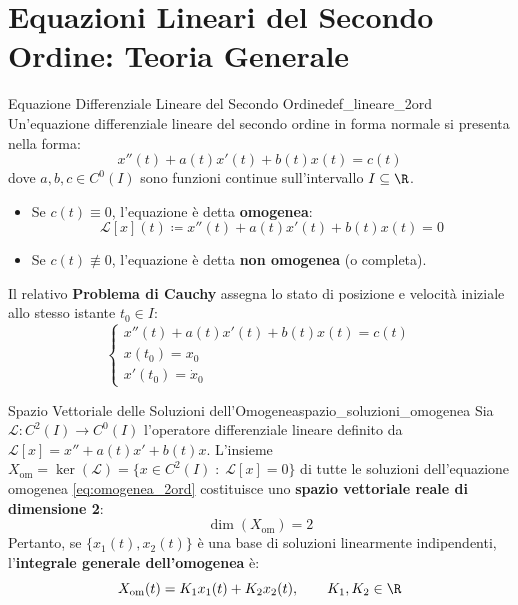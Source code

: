 \section{Equazioni Lineari del Secondo Ordine: Teoria Generale}
\label{sec:lineari_secondo_ordine}

\begin{definizione}{Equazione Differenziale Lineare del Secondo Ordine}{def_lineare_2ord}
Un'equazione differenziale lineare del secondo ordine in forma normale si presenta nella forma:
\begin{equation}
    \label{eq:lineare_2ord}
    x''(t) + a(t) x'(t) + b(t) x(t) = c(t)
\end{equation}
dove $a, b, c \in C^0(I)$ sono funzioni continue sull'intervallo $I \subseteq \R$.
\begin{itemize}
    \item Se $c(t) \equiv 0$, l'equazione è detta \textbf{omogenea}:
    \begin{equation}
        \label{eq:omogenea_2ord}
        \mathcal{L}[x](t) \coloneqq x''(t) + a(t) x'(t) + b(t) x(t) = 0
    \end{equation}
    \item Se $c(t) \not\equiv 0$, l'equazione è detta \textbf{non omogenea} (o completa).
\end{itemize}
Il relativo \textbf{Problema di Cauchy} assegna lo stato di posizione e velocità iniziale allo stesso istante $t_0 \in I$:
\begin{equation}
    \label{eq:cauchy_2ord}
    \begin{cases}
        x''(t) + a(t) x'(t) + b(t) x(t) = c(t) \\
        x(t_0) = x_0 \\
        x'(t_0) = \dot{x}_0
    \end{cases}
\end{equation}
\end{definizione}

\begin{teorema}{Spazio Vettoriale delle Soluzioni dell'Omogenea}{spazio_soluzioni_omogenea}
Sia $\mathcal{L} \colon C^2(I) \to C^0(I)$ l'operatore differenziale lineare definito da $\mathcal{L}[x] = x'' + a(t)x' + b(t)x$.
L'insieme $X_{\text{om}} = \ker(\mathcal{L}) = \{ x \in C^2(I) \;\colon\; \mathcal{L}[x] = 0 \}$ di tutte le soluzioni dell'equazione omogenea \eqref{eq:omogenea_2ord} costituisce uno \textbf{spazio vettoriale reale di dimensione 2}:
\begin{equation}
    \dim(X_{\text{om}}) = 2
\end{equation}
Pertanto, se $\{x_1(t), x_2(t)\}$ è una base di soluzioni linearmente indipendenti, l'\textbf{integrale generale dell'omogenea} è:
\begin{equation}
    \label{eq:integrale_generale_omogenea}
    X_{\text{om}}(t) = K_1 x_1(t) + K_2 x_2(t), \qquad K_1, K_2 \in \R
\end{equation}
\end{teorema}


